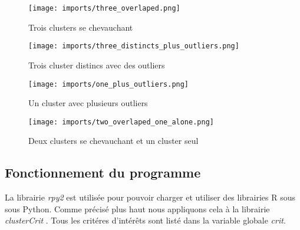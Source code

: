 \begin{center}
    \begin{figure}[ht!]
        \centering
        
        \texttt{[image: imports/three\_overlaped.png]}
        
        \caption{Trois clusters se chevauchant}
    \end{figure}
\end{center}

\begin{center}
    \begin{figure}[ht!]
        \centering
        
        \texttt{[image: imports/three\_distincts\_plus\_outliers.png]}
        
        \caption{Trois cluster distincs avec des outliers}
    \end{figure}
\end{center}

\begin{center}
    \begin{figure}[ht!]
        \centering
        
        \texttt{[image: imports/one\_plus\_outliers.png]}
        
        \caption{Un cluster avec plusieurs outliers}
    \end{figure}
\end{center}


\begin{center}
    \begin{figure}[ht!]
        \centering
        
        \texttt{[image: imports/two\_overlaped\_one\_alone.png]}
        
        \caption{Deux clusters se chevauchant et un cluster seul}
    \end{figure}
\end{center}




\subsection{Fonctionnement du programme}
La librairie \textit{rpy2} est utilisée pour pouvoir charger et utiliser des librairies R sous sous Python. Comme précisé plus haut
nous appliquons cela à la librairie \textit{clusterCrit} . Tous les critéres d'intérêts sont listé dans la variable globale \textit{crit}.


